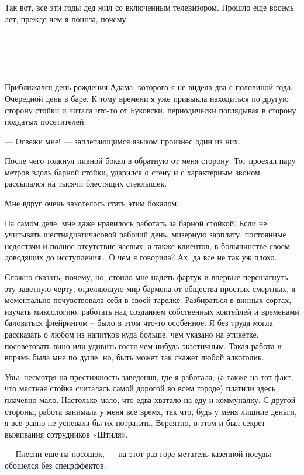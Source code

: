 \documentclass[
]{book}
\begin{document}
Так вот, все эти годы дед жил со включенным телевизором. Прошло еще восемь лет, прежде чем я поняла, почему.

\hypertarget{chapter-2}{%
\chapter{~}\label{chapter-2}}

Приближался день рождения Адама, которого я не видела два с половиной года. Очередной день в баре. К тому времени я уже привыкла находиться по другую сторону стойки и читала что-то от Буковски, периодически поглядывая в сторону поддатых посетителей.

--- Освежи мне! --- заплетающимся языком произнес один из них.

После чего толкнул пивной бокал в обратную от меня сторону. Тот проехал пару метров вдоль барной стойки, ударился о стену и с характерным звоном рассыпался на тысячи блестящих стеклышек.

Мне вдруг очень захотелось стать этим бокалом.

На самом деле, мне даже нравилось работать за барной стойкой. Если не учитывать шестнадцатичасовой рабочий день, мизерную зарплату, постоянные недостачи и полное отсутствие чаевых, а также клиентов, в большинстве своем доводящих до исступления\ldots{} О чем я говорила? Ах, да все не так уж плохо.

Сложно сказать, почему, но, стоило мне надеть фартук и впервые перешагнуть эту заветную черту, отделяющую мир бармена от общества простых смертных, я моментально почувствовала себя в своей тарелке. Разбираться в винных сортах, изучать миксологию, работать над созданием собственных коктейлей и временами баловаться флейрингом -- было в этом что-то особенное. Я без труда могла рассказать о любом из напитков куда больше, чем указано на этикетке, посоветовать вино или удивить гостя чем-нибудь экзотичным. Такая работа и впрямь была мне по душе, но, быть может так скажет любой алкоголик.

Увы, несмотря на престижность заведения, где я работала, (а также на тот факт, что местная стойка считалась самой дорогой во всем городе) платили здесь плачевно мало. Настолько мало, что едва хватало на еду и коммуналку. С другой стороны, работа занимала у меня все время, так что, будь у меня лишние деньги, я все равно не успевала бы их потратить. Вероятно, в этом и был секрет выживания сотрудников «Штиля».

--- Плесни еще на посошок, --- на этот раз горе-метатель казенной посуды обошелся без спецэффектов.
\end{document}

